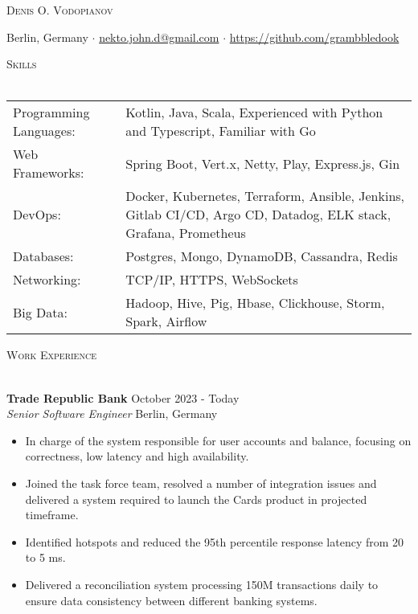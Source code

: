 \documentclass[a4paper]{article}
\makeatletter
\newcommand{\lineunder} {
    \vspace*{-8pt} \\
    \hspace*{-18pt} \hrulefill \\
}
\newcommand{\header} [1] {
        {\hspace*{-18pt}\vspace*{6pt} \textsc{#1}}
    \vspace*{-6pt} \lineunder
}
\newcommand{\employer} [4] {
    \textbf{#1} \hfill {#3} \\
    \textit{#2} \hfill {#4} \\
    \vspace{0mm}
}
\def\email{nekto.john.d@gmail.com}
\def\phone{555-55-55}
\makeatother
\begin{document}
    \vspace*{-40pt}


    \vspace*{-10pt}
    \begin{center}
        \Huge \scshape {Denis O. Vodopianov} \\ \vspace{1mm}
    \end{center}

    \begin{center}
        Berlin, Germany $\cdot$
        \href{mailto:\email}{\email} $\cdot$
        \url{https://github.com/grambbledook}\\
    \end{center}

    \header{Skills}
    \begin{tabular}{V{5cm} @{\hskip 0.6cm} V{16cm}}
        Programming Languages: & Kotlin, Java,  Scala, Experienced with Python and Typescript, Familiar with Go                                 \\
        Web Frameworks:        & Spring Boot, Vert.x, Netty, Play, Express.js, Gin                                                            \\
        DevOps:                & Docker, Kubernetes, Terraform, Ansible, Jenkins, Gitlab CI/CD, Argo CD, Datadog, ELK stack, Grafana, Prometheus \\
        Databases:             & Postgres, Mongo, DynamoDB, Cassandra, Redis                                                                         \\
        Networking:            & TCP/IP, HTTPS, WebSockets                                                                                    \\
        Big Data:              & Hadoop, Hive, Pig, Hbase, Clickhouse, Storm, Spark, Airflow                                                  \\
    \end{tabular}
    \vspace{2mm}


    \header{Work Experience}
    \vspace{1mm}

    \employer{Trade Republic Bank}{Senior Software Engineer}{October 2023 - Today}{Berlin, Germany}
    \begin{itemize}[itemsep=-1mm]
        \item In charge of the system responsible for user accounts and balance, focusing on correctness, low latency and high availability.
        \item Joined the task force team, resolved a number of integration issues and delivered a system required to launch the Cards product in projected timeframe.
        \item Identified hotspots and reduced the 95th percentile response latency from 20 to 5 ms.
        \item Delivered a reconciliation system processing 150M transactions daily to ensure data consistency between different banking systems.
    \end{itemize}
\end{document}
